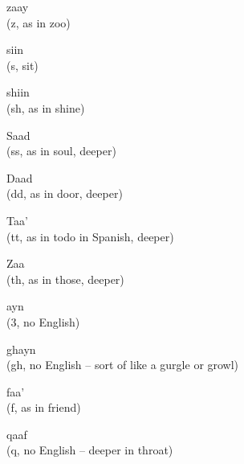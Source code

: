\begin{flashcard}{\LARGE zaay \\ (z, as in zoo)}
\LARGE {}
\end{flashcard}
\begin{flashcard}{\LARGE siin \\ (s, sit)}
\LARGE {}
\end{flashcard}
\begin{flashcard}{\LARGE shiin \\ (sh, as in shine)}
\LARGE {}
\end{flashcard}
\begin{flashcard}{\LARGE Saad \\ (ss, as in soul, deeper)}
\LARGE {}
\end{flashcard}
\begin{flashcard}{\LARGE Daad \\ (dd, as in door, deeper)}
\LARGE {}
\end{flashcard}
\begin{flashcard}{\LARGE Taa' \\ (tt, as in todo in Spanish, deeper)}
\LARGE {}
\end{flashcard}
\begin{flashcard}{\LARGE Zaa \\ (th, as in those, deeper)}
\LARGE {}
\end{flashcard}
\begin{flashcard}{\LARGE ayn \\ (3, no English)}
\LARGE {}
\end{flashcard}
\begin{flashcard}{\LARGE ghayn \\ (gh, no English -- sort of like a gurgle or growl)}
\LARGE {}
\end{flashcard}
\begin{flashcard}{\LARGE faa' \\ (f, as in friend)}
\LARGE {}
\end{flashcard}
\begin{flashcard}{\LARGE qaaf \\ (q, no English -- deeper in throat)}
\LARGE {}
\end{flashcard}
